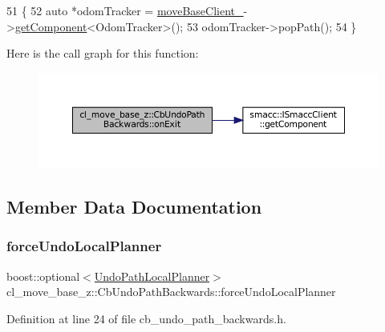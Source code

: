 \begin{DoxyCode}
51 \{
52   \textcolor{keyword}{auto} *odomTracker = \hyperlink{classcl__move__base__z_1_1CbMoveBaseClientBehaviorBase_ab2ef219464cfac8659b4a87c8d0db6d5}{moveBaseClient\_}->\hyperlink{classsmacc_1_1ISmaccClient_adef78db601749ca63c19e74a27cb88cc}{getComponent}<OdomTracker>();
53   odomTracker->popPath();
54 \}
\end{DoxyCode}
Here is the call graph for this function\+:
\nopagebreak
\begin{figure}[H]
\begin{center}
\leavevmode
\includegraphics[width=350pt]{classcl__move__base__z_1_1CbUndoPathBackwards_a20cee921ad92db16f8d17c3c3b9c2daf_cgraph}
\end{center}
\end{figure}


\subsection{Member Data Documentation}
\mbox{\label{classcl__move__base__z_1_1CbUndoPathBackwards_a2dfb07d7391147e2fc06e01749bfd5bc}} 
\subsubsection{\texorpdfstring{force\+Undo\+Local\+Planner}{forceUndoLocalPlanner}}
{\footnotesize\ttfamily boost\+::optional$<$\hyperlink{namespacecl__move__base__z_aa8702d7f4bc14a650da006a263801a8b}{Undo\+Path\+Local\+Planner}$>$ cl\+\_\+move\+\_\+base\+\_\+z\+::\+Cb\+Undo\+Path\+Backwards\+::force\+Undo\+Local\+Planner}



Definition at line 24 of file cb\+\_\+undo\+\_\+path\+\_\+backwards.\+h.



